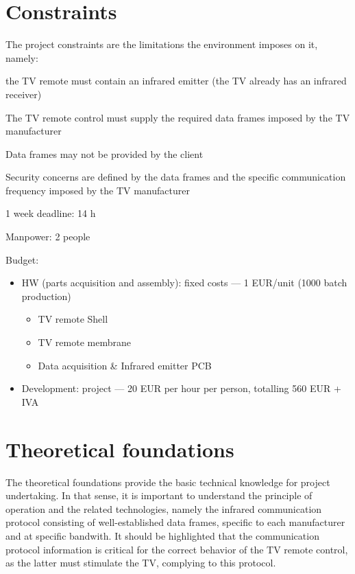 \section{Constraints}
\label{sec:constraints}
The project constraints are the limitations the environment imposes on it, namely:
\begin{item-c}
\item the TV remote must contain an infrared emitter (the TV already has an infrared receiver)
\item The TV remote control must supply the required data frames imposed by the TV
  manufacturer
\item Data frames may not be provided by the client
\item Security concerns are defined by the data frames and the specific
  communication frequency imposed by the TV manufacturer
\item 1 week deadline: 14 h
\item Manpower: 2 people
\item Budget:
  \begin{itemize}
  \item HW (parts acquisition and assembly): fixed costs --- 1 EUR/unit (1000
    batch production)
    \begin{itemize}
    \item TV remote Shell
    \item TV remote membrane
    \item Data acquisition \& Infrared emitter PCB
    \end{itemize}
  \item Development: project --- 20 EUR per hour per person, totalling 560 EUR +
    IVA
  \end{itemize}
\end{item-c}

\section{Theoretical foundations}
\label{sec:theor-found}
The theoretical foundations provide the basic technical knowledge for project
undertaking. In that sense, it is important to understand the principle of
operation and the related technologies, namely the infrared communication
protocol consisting of well-established data frames, specific to each
manufacturer and at specific bandwith. It should be highlighted that the
communication protocol information is critical for the correct behavior of the
TV remote control, as the latter must stimulate the TV, complying to this protocol.

